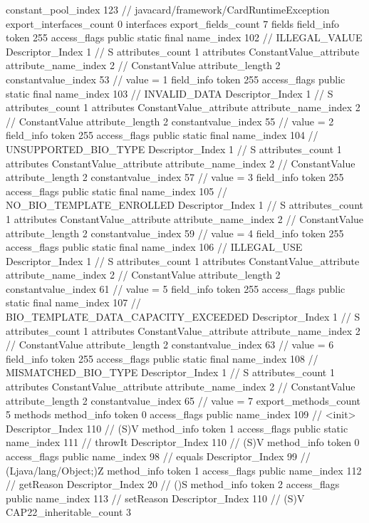 {{{{				constant_pool_index	123		// javacard/framework/CardRuntimeException
			}
			export_interfaces_count	0
			interfaces {
			}
			export_fields_count	7
			fields {
			field_info {
				token	255
				access_flags	public static final
				name_index	102		// ILLEGAL_VALUE
				Descriptor_Index	1		// S
				attributes_count	1
				attributes {
				ConstantValue_attribute {
					attribute_name_index	2		// ConstantValue
					attribute_length	2
					constantvalue_index	53		// value = 1
				}
				}
			}
			field_info {
				token	255
				access_flags	public static final
				name_index	103		// INVALID_DATA
				Descriptor_Index	1		// S
				attributes_count	1
				attributes {
				ConstantValue_attribute {
					attribute_name_index	2		// ConstantValue
					attribute_length	2
					constantvalue_index	55		// value = 2
				}
				}
			}
			field_info {
				token	255
				access_flags	public static final
				name_index	104		// UNSUPPORTED_BIO_TYPE
				Descriptor_Index	1		// S
				attributes_count	1
				attributes {
				ConstantValue_attribute {
					attribute_name_index	2		// ConstantValue
					attribute_length	2
					constantvalue_index	57		// value = 3
				}
				}
			}
			field_info {
				token	255
				access_flags	public static final
				name_index	105		// NO_BIO_TEMPLATE_ENROLLED
				Descriptor_Index	1		// S
				attributes_count	1
				attributes {
				ConstantValue_attribute {
					attribute_name_index	2		// ConstantValue
					attribute_length	2
					constantvalue_index	59		// value = 4
				}
				}
			}
			field_info {
				token	255
				access_flags	public static final
				name_index	106		// ILLEGAL_USE
				Descriptor_Index	1		// S
				attributes_count	1
				attributes {
				ConstantValue_attribute {
					attribute_name_index	2		// ConstantValue
					attribute_length	2
					constantvalue_index	61		// value = 5
				}
				}
			}
			field_info {
				token	255
				access_flags	public static final
				name_index	107		// BIO_TEMPLATE_DATA_CAPACITY_EXCEEDED
				Descriptor_Index	1		// S
				attributes_count	1
				attributes {
				ConstantValue_attribute {
					attribute_name_index	2		// ConstantValue
					attribute_length	2
					constantvalue_index	63		// value = 6
				}
				}
			}
			field_info {
				token	255
				access_flags	public static final
				name_index	108		// MISMATCHED_BIO_TYPE
				Descriptor_Index	1		// S
				attributes_count	1
				attributes {
				ConstantValue_attribute {
					attribute_name_index	2		// ConstantValue
					attribute_length	2
					constantvalue_index	65		// value = 7
				}
				}
			}
			}
			export_methods_count	5
			methods {
				method_info {
					token	0
					access_flags	public
					name_index	109		// <init>
					Descriptor_Index	110		// (S)V
				}
				method_info {
					token	1
					access_flags	public static
					name_index	111		// throwIt
					Descriptor_Index	110		// (S)V
				}
				method_info {
					token	0
					access_flags	public
					name_index	98		// equals
					Descriptor_Index	99		// (Ljava/lang/Object;)Z
				}
				method_info {
					token	1
					access_flags	public
					name_index	112		// getReason
					Descriptor_Index	20		// ()S
				}
				method_info {
					token	2
					access_flags	public
					name_index	113		// setReason
					Descriptor_Index	110		// (S)V
				}
			}
			CAP22_inheritable_count	3
		}
	}
}
